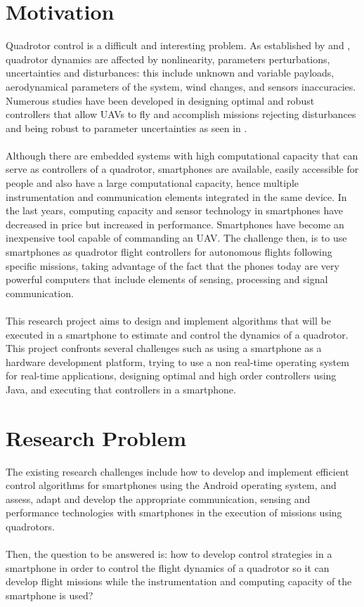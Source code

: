 \section{Motivation}
Quadrotor control is a difficult and interesting problem. As established by \cite{Liu2015} and \cite{Lopez2015}, quadrotor dynamics are affected by nonlinearity, parameters perturbations, uncertainties and disturbances: this include unknown and variable payloads, aerodynamical parameters of the system, wind changes, and sensors inaccuracies. Numerous studies have been developed in designing optimal and robust controllers that allow UAVs to fly and accomplish missions rejecting disturbances and being robust to parameter uncertainties as seen in \cite{Jung2014, Kohno2014, Shang2016, Salazar2014}.\\\\
Although there are embedded systems with high computational capacity that can serve as controllers of a quadrotor, smartphones are available, easily accessible for people and also have a large computational capacity, hence multiple instrumentation and communication elements integrated in the same device. In the last years, computing capacity and sensor technology in smartphones have decreased in price but increased in performance. Smartphones have become an inexpensive tool capable of commanding an UAV. The challenge then, is to use smartphones as quadrotor flight controllers for autonomous flights following specific missions, taking advantage of the fact that the phones today are very powerful computers that include elements of sensing, processing and signal communication.
\\\\
This research project aims to design and implement algorithms that will be executed in a smartphone to estimate and control the dynamics of a quadrotor. This project confronts several challenges such as using a smartphone as a hardware development platform, trying to use a non real-time operating system for real-time applications, designing optimal and high order controllers using Java, and executing that controllers in a smartphone. 

\section{Research Problem}
The existing research challenges include how to develop and implement efficient control algorithms for smartphones using the Android operating system, and assess, adapt and develop the appropriate communication, sensing and performance technologies with smartphones in the execution of missions using quadrotors.
\\\\
Then, the question to be answered is: how to develop control strategies in a smartphone in order to control the flight dynamics of a quadrotor so it can develop flight missions while the instrumentation and computing capacity of the smartphone is used?
